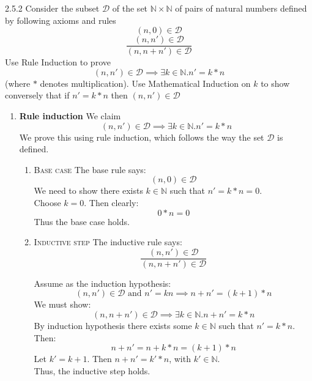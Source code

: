 \begin{exercise}{2.5.2}
Consider the subset $\mathcal{D}$ of the set $\mathbb{N}\times\mathbb{N}$ of pairs of natural numbers defined by following axioms and rules
    \[(n,0) \in \mathcal{D}\]
    \[\frac{(n,n')\in \mathcal{D}}{(n, n+n')\in \mathcal{D}}\]
Use Rule Induction to prove
\[(n,n')\in \mathcal{D} \implies \exists k \in \mathbb{N} . n'=k\ast n\]
(where $\ast$ denotes multiplication). Use Mathematical Induction on $k$ to show conversely that if $n'=k\ast n$ then $(n,n') \in \mathcal{D}$

\end{exercise}

\begin{solution}
\begin{enumerate}
    \item \textbf{Rule induction} We claim \[(n,n')\in \mathcal{D} \implies \exists k \in \mathbb{N} . n'=k\ast n\]
We prove this using rule induction, which follows the way the set $\mathcal{D}$ is defined.
        \begin{enumerate}
            \item \textsc{Base case} The base rule says:
\[(n,0) \in \mathcal{D}\]
We need to show there exists 
$k\in \mathbb{N}$ such that $n'= k\ast n  = 0$. 
\\
Choose $k=0$. Then clearly:
\[0\ast n= 0 \]
Thus the base case holds.
            \item \textsc{Inductive step} The inductive rule says:
\[\frac{(n,n')\in \mathcal{D}}{(n, n+n')\in \mathcal{D}}\]

Assume as the induction hypothesis:
\[(n,n') \in \mathcal{D} \text{ and } n'=kn \implies n+n'= (k+1)\ast n\]
We must show: 
\[(n,n+n') \in \mathcal{D} \implies \exists k \in \mathbb{N}. n+n' = k\ast n\]
By induction hypothesis there exists some $k\in \mathbb{N}$ such that $n'=k\ast n$. Then:
\[n+n' = n+k\ast n = (k+1)\ast n\]
Let $k'=k+1$. Then $n+n' = k'\ast n$, with $k'\in \mathbb{N}$.
\\
Thus, the inductive step holds.
        
\end{enumerate}


\end{enumerate}
\end{solution}
